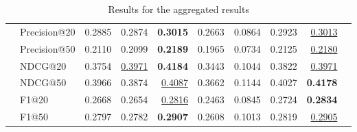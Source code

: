\begin{table*}[]
{\begin{tabular}{@{}l|l|rrrrrr|rl@{}}
                        & Precision@20 & 0.2885       & 0.2874       & \textbf{0.3015} & 0.2663 & 0.0864          & 0.2923 & {\ul {0.3013}}    &  \\
                        & Precision@50 & 0.2110       & 0.2099       & \textbf{0.2189} & 0.1965 & 0.0734          & 0.2125 & {\ul {0.2180}}    &  \\
                        & NDCG@20      & 0.3754       & {\ul{ 0.3971}} & \textbf{0.4184} & 0.3443 & 0.1044          & 0.3822 & {\ul {0.3971}}    &  \\
                        & NDCG@50      & 0.3966       & 0.3874       & {\ul {0.4087}}    & 0.3662 & 0.1144          & 0.4027 & \textbf{0.4178} &  \\
                        & F1@20        & 0.2668       & 0.2654       & {\ul{0.2816}}    & 0.2463 & 0.0845          & 0.2724 & \textbf{0.2834} &  \\
                        & F1@50        & 0.2797       & 0.2782       & \textbf{0.2907} & 0.2608 & 0.1013          & 0.2819 & {\ul{0.2905}}    &  \\ \bottomrule
\end{tabular}%
}
\caption{Results for the aggregated results}
\label{tab:aggregatedresults}
\end{table*}

